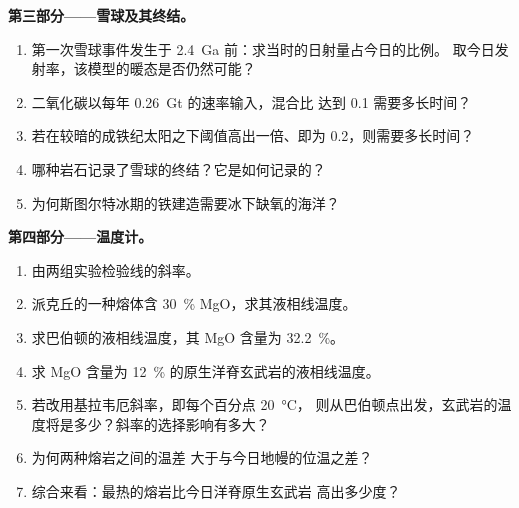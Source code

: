 \begin{problem}
\noindent\textbf{第三部分——雪球及其终结。}
\begin{enumerate}[resume]
  \item 第一次雪球事件发生于 \qty{2.4}{Ga} 前：求当时的日射量占今日的比例。
        取今日发射率，该模型的暖态是否仍然可能？
  \item 二氧化碳以每年 \qty{0.26}{Gt} 的速率输入，混合比
        达到 0.1 需要多长时间？
  \item 若在较暗的成铁纪太阳之下阈值高出一倍、即为 0.2，则需要多长时间？
  \item 哪种岩石记录了雪球的终结？它是如何记录的？
  \item 为何斯图尔特冰期的铁建造需要冰下缺氧的海洋？
\end{enumerate}

\noindent\textbf{第四部分——温度计。}
\begin{enumerate}[resume]
  \item 由两组实验检验线的斜率。
  \item 派克丘的一种熔体含 \qty{30}{\percent} MgO，求其液相线温度。
  \item 求巴伯顿的液相线温度，其 MgO 含量为 \qty{32.2}{\percent}。
  \item 求 MgO 含量为 \qty{12}{\percent} 的原生洋脊玄武岩的液相线温度。
  \item 若改用基拉韦厄斜率，即每个百分点 \qty{20}{\celsius}，
        则从巴伯顿点出发，玄武岩的温度将是多少？斜率的选择影响有多大？
  \item 为何两种熔岩之间的温差
        大于与今日地幔的位温之差？
  \item 综合来看：最热的熔岩比今日洋脊原生玄武岩
        高出多少度？
\end{enumerate}
\end{problem}
